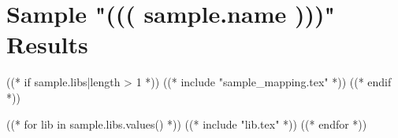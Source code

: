 \part{Sample "((( sample.name )))" Results}
\label{sample:(((sample.name)))}

((* if sample.libs|length > 1 *))
((* include "sample_mapping.tex" *))
((* endif *))

((* for lib in sample.libs.values() *))
((* include "lib.tex" *))
\clearpage
((* endfor *))
